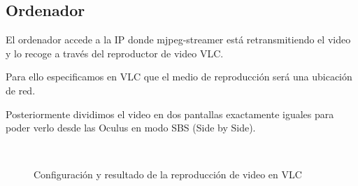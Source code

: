 \documentclass[twoside, 12pt]{epstfg}
\begin{document}
\newpage
\subsection{Ordenador}
El ordenador accede a la IP donde mjpeg-streamer está retransmitiendo el video y lo recoge a través del reproductor de video VLC.

Para ello especificamos en VLC que el medio de reproducción será una ubicación de red.

Posteriormente dividimos el video en dos pantallas exactamente iguales para poder verlo desde las Oculus en modo SBS (Side by Side).

\begin{figure}[h]
	\centering
	\\
		\caption{Configuración y resultado de la reproducción de video en VLC} \label{figstream}
\end{figure}
\end{document}
